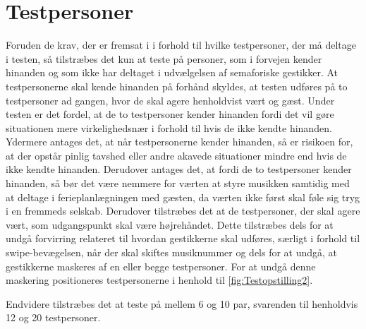 \section{Testpersoner}
\label{TestpersonerSocialAccept}
%
Foruden de krav, der er fremsat i  i forhold til hvilke testpersoner, der må deltage i testen, så tilstræbes det kun at teste på personer, som i forvejen kender hinanden og som ikke har deltaget i udvælgelsen af semaforiske gestikker. At testpersonerne skal kende hinanden på forhånd skyldes, at testen udføres på to testpersoner ad gangen, hvor de skal agere henholdvist vært og gæst. Under testen er det fordel, at de to testpersoner kender hinanden fordi det vil gøre situationen mere virkelighedsnær i forhold til hvis de ikke kendte hinanden. Ydermere antages det, at når testpersonerne kender hinanden, så er risikoen for, at der opstår pinlig tavshed eller andre akavede situationer mindre end hvis de ikke kendte hinanden. Derudover antages det, at fordi de to testpersoner kender hinanden, så bør det være nemmere for værten at styre musikken samtidig med at deltage i ferieplanlægningen med gæsten, da værten ikke først skal føle sig tryg i en fremmeds selskab. Derudover tilstræbes det at de testpersoner, der skal agere vært, som udgangspunkt skal være højrehåndet. Dette tilstræbes dels for at undgå forvirring relateret til hvordan gestikkerne skal udføres, særligt i forhold til swipe-bevægelsen, når der skal skiftes musiknummer og dels for at undgå, at gestikkerne maskeres af en eller begge testpersoner. For at undgå denne maskering positioneres testpersonerne i henhold til \autoref{fig:Testopstilling2}.

Endvidere tilstræbes det at teste på mellem 6 og 10 par, svarenden til henholdvis 12 og 20 testpersoner. 